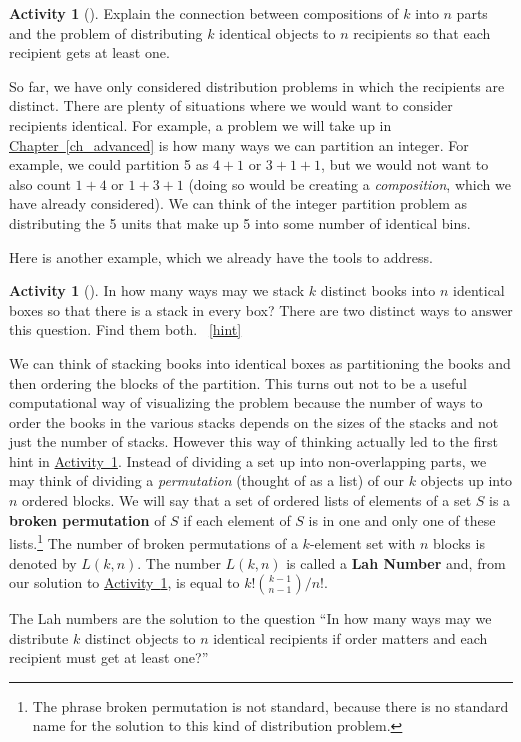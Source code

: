 \documentclass[10pt,]{book}
\newcommand{\terminology}[1]{\textbf{#1}}
\theoremstyle{plain}
\theoremstyle{definition}
\theoremstyle{definition}
\theoremstyle{definition}
\newtheorem{activity}[project]{Activity}
\numberwithin{equation}{chapter}
\begin{document}
\begin{activity}[]\label{activity-123}
\hypertarget{p-871}{}%
Explain the connection between compositions of \(k\) into \(n\) parts and the problem of distributing \(k\) identical objects to \(n\) recipients so that each recipient gets at least one.%
\end{activity}
\hypertarget{p-873}{}%
So far, we have only considered distribution problems in which the recipients are distinct.  There are plenty of situations where we would want to consider recipients identical.  For example, a problem we will take up in \hyperref[ch_advanced]{Chapter~\ref{ch_advanced}} is how many ways we can partition an integer.  For example, we could partition 5 as \(4+1\) or \(3+1+1\), but we would not want to also count \(1+4\) or \(1+3+1\) (doing so would be creating a \emph{composition}, which we have already considered).  We can think of the integer partition problem as distributing the 5 units that make up 5 into some number of identical bins.%
\par
\hypertarget{p-874}{}%
Here is another example, which we already have the tools to address.%
\begin{activity}[]\label{brokenpermutation}
\hypertarget{p-875}{}%
In how many ways may we stack \(k\) distinct books into \(n\) identical boxes so that there is a stack in every box? There are two distinct ways to answer this question.  Find them both.%
~\hfill{\tiny\hyperlink{a-131}{[hint]}\hypertarget{q-131}{}}\end{activity}
\hypertarget{p-880}{}%
We can think of stacking books into identical boxes as partitioning the books and then ordering the blocks of the partition. This turns out not to be a useful computational way of visualizing the problem because the number of ways to order the books in the various stacks depends on the sizes of the stacks and not just the number of stacks. However this way of thinking actually led to the first hint in \hyperref[brokenpermutation]{Activity~\ref{brokenpermutation}}. Instead of dividing a set up into non-overlapping parts, we may think of dividing a \emph{permutation} (thought of as a list) of our \(k\) objects up into \(n\) ordered blocks. We will say that a set of ordered lists of elements of a set \(S\) is a \terminology{broken permutation}   of \(S\) if each element of \(S\) is in one and only one of these lists.\footnote{The phrase broken permutation is not standard, because there is no standard name for the solution to this kind  of distribution problem.\label{fn-11}} The number of broken permutations of a \(k\)-element set with \(n\) blocks is denoted by \(L(k,n)\). The number \(L(k,n)\) is called a \terminology{Lah Number} and, from our solution to \hyperref[brokenpermutation]{Activity~\ref{brokenpermutation}}, is equal to \(k!\binom{k-1}{n-1}/n!\).%
\par
\hypertarget{p-881}{}%
The Lah numbers are the solution to the question ``In how many ways may we distribute \(k\) distinct objects to \(n\) identical recipients if order matters and each recipient must get at least one?''%
\typeout{************************************************}
\typeout{************************************************}
\end{document}

